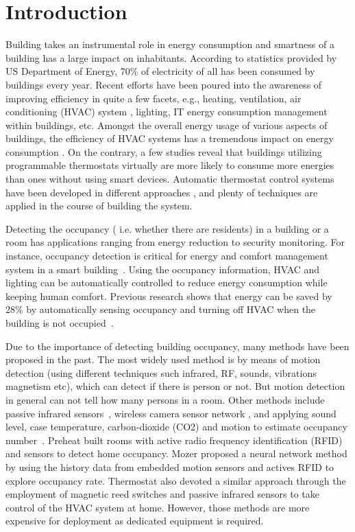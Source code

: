 \section{Introduction}

Building takes an instrumental role in energy consumption and smartness of a
building has a large impact on inhabitants. According to statistics provided by
US Department of Energy, 70\% of electricity of all has been consumed by
buildings every year. Recent efforts have been poured into the awareness of
improving efficiency in quite a few facets, e.g., heating, ventilation, air
conditioning (HVAC) system \cite{erickson2009energy}\cite{gao2009selfprog},
lighting\cite{delaney2009eval}, IT energy consumption management within
buildings\cite{agarwal2009augnet}\cite{agarwal2010sleep}, etc. Amongst the
overall energy usage of various aspects of buildings, the efficiency of HVAC
systems has a tremendous impact on energy consumption \cite{hobby2012analysis}.
On the contrary, a few studies \cite{bias1999elec} reveal that buildings
utilizing programmable thermostats virtually are more likely to consume more
energies than ones without using smart devices. Automatic thermostat control
systems have been developed in different approaches
\cite{thomas2012intelligent}\cite{lu2012eval}, and plenty of techniques are
applied in the course of building the system.

Detecting the occupancy ( i.e. whether there are residents) in a
building or a room has applications ranging from energy reduction
to security monitoring.
For instance, occupancy detection is critical for energy and comfort
management system in a smart building~\cite{Nguyen2013Energy}.  Using
the occupancy information, HVAC and lighting can be automatically
controlled to reduce energy consumption while keeping human comfort.
Previous research shows that energy can be saved by 28\% by
automatically sensing occupancy and turning off HVAC when the building
is not occupied~\cite{Lu:SenSys10}.

Due to the importance of detecting building occupancy, many methods
have been proposed in the past. The most widely used method is by
means of motion detection (using different techniques such infrared,
RF, sounds, vibrations magnetism etc), which can detect if there is
person or not. But motion detection in general can not tell how many
persons in a room.  Other methods include passive infrared
sensors~\cite{Dodier2006Building}, wireless camera sensor network
\cite{erickson2009energy}, and applying sound level, case temperature,
carbon-dioxide (CO2) and motion to estimate occupancy
number~\cite{Ekwevugbe2013Real}.  Preheat \cite{scott2011ctrl} built rooms with
active radio frequency identification (RFID) and sensors to detect
home occupancy. Mozer \cite{mozer1997neurothermostat} proposed a neural network method by
using the history data from embedded motion sensors and actives RFID
to explore occupancy rate. Thermostat \cite{lu2010smartthermostat} also devoted a
similar approach through the employment of magnetic reed switches and
passive infrared sensors to take control of the HVAC system at
home. However, those methods are more expensive for deployment as
dedicated equipment is required.

